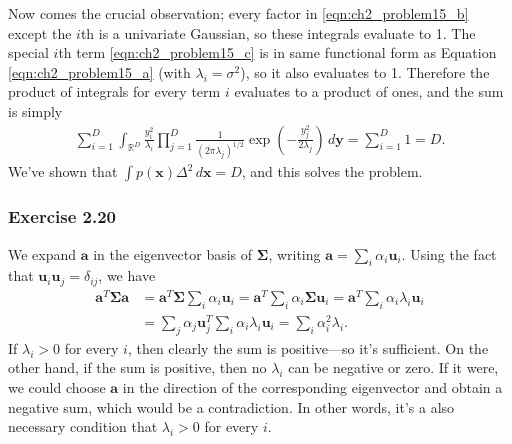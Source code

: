 \documentclass[12pt, a4paper]{article}
\newcommand{\R}{\mathbb{R}}
\newcommand{\vect}[1]{\bm{#1}}
\begin{document}
Now comes the crucial observation; every factor in \eqref{eqn:ch2_problem15_b} except the $i$th is a univariate Gaussian, so these integrals evaluate to 1.
The special $i$th term \eqref{eqn:ch2_problem15_c} is in same functional form as Equation \eqref{eqn:ch2_problem15_a} (with $\lambda_i = \sigma^2$), so it also evaluates to 1.
Therefore the product of integrals for every term $i$ evaluates to a product of ones, and the sum is simply
\begin{align*}
\sum_{i=1}^{D} \int_{\R^D}  \frac{y_i^2}{\lambda_i} 
\prod_{j=1}^{D} \frac{1}{(2 \pi \lambda_j)^{1/2}} 
\exp \left( - \frac{y_j^2}{2 \lambda_j} \right)  \, d \vect{y}
=
\sum_{i=1}^{D} 1 = D.
\end{align*}
We've shown that $\int p(\vect{x}) \Delta^2 \, d\vect{x} = D$, and this solves the problem.

\subsubsection*{Exercise 2.20}
We expand $\vect{a}$ in the eigenvector basis of $\vect{\Sigma}$, writing $\vect{a} = \sum_i \alpha_i \vect{u}_i$.
Using the fact that $\vect{u}_i \vect{u}_j = \delta_{ij}$, we have
\begin{align*}
	\vect{a}^T \vect{\Sigma} \vect{a} 
	&= \vect{a}^T \vect{\Sigma} \sum_i \alpha_i \vect{u}_i
	= \vect{a}^T \sum_i \alpha_i \vect{\Sigma} \vect{u}_i
	= \vect{a}^T \sum_i \alpha_i \lambda_i \vect{u}_i \\
	&= \sum_j \alpha_j \vect{u}^T_j \sum_i \alpha_i \lambda_i \vect{u}_i
	= \sum_i \alpha_i^2 \lambda_i.
\end{align*}
If $\lambda_i > 0$ for every $i$, then clearly the sum is positive---so it's sufficient.
On the other hand, if the sum is positive, then no $\lambda_i$ can be negative or zero.
If it were, we could choose $\vect{a}$ in the direction of the corresponding eigenvector and obtain a negative sum, which would be a contradiction.
In other words, it's a also necessary condition that $\lambda_i > 0$ for every $i$.
\end{document}
